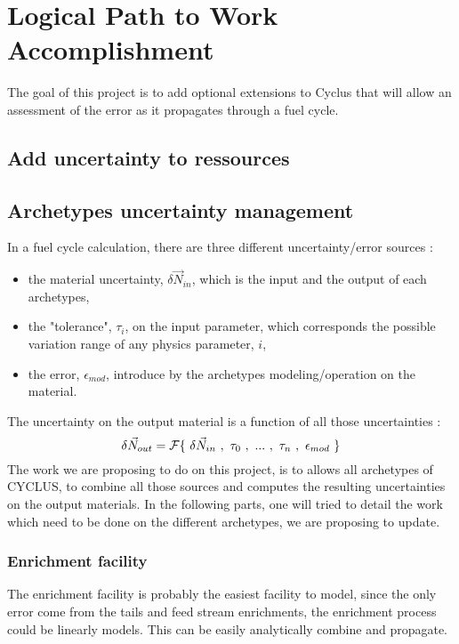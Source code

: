 \documentclass[dvips,12pt]{article}
\begin{document}
\section{Logical Path to Work Accomplishment}
The goal of this project is to add optional extensions to Cyclus that will allow an assessment of the error as it propagates  through a fuel cycle. 
\subsection{Add uncertainty to ressources}

\subsection{Archetypes uncertainty management}
In a fuel cycle calculation, there are three different uncertainty/error sources :
\begin{itemize}
\item the material uncertainty, $\delta\vec{N}_{in}$, which is the input and the output of each archetypes,
\item the "tolerance", $\tau_{i}$,  on the input parameter, which corresponds the possible variation range of any physics parameter, $i$,
\item the error, $\epsilon_{mod}$, introduce by the archetypes modeling/operation on the material.
\end{itemize}
The uncertainty on the output  material is a function of all those uncertainties :
\begin{equation}
\delta \vec{N}_{out} = {\cal F}\{~\delta\vec{N}_{in}~,~\tau_0~,~...~,~\tau_n~,~\epsilon_{mod}~\}
\end{equation}
The work we are proposing to do on this project, is to allows all archetypes of CYCLUS, to combine all those sources and computes the resulting uncertainties on the output materials.
In the following parts, one will tried to detail the work which need to be done on the different archetypes, we are proposing to update.
\subsubsection{Enrichment facility}
The enrichment facility is probably the easiest facility to model, since the only error come from the tails and feed stream enrichments, the enrichment process could be linearly models. This can be easily analytically combine and propagate.%
\end{document}
